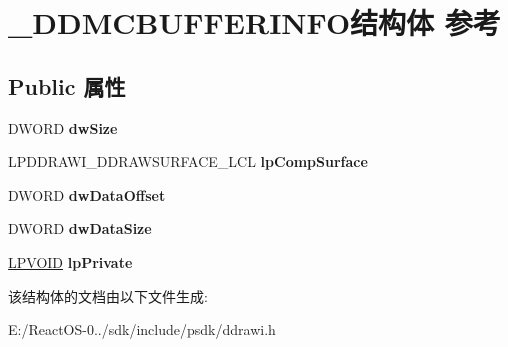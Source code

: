 \hypertarget{struct___d_d_m_c_b_u_f_f_e_r_i_n_f_o}{}\section{\+\_\+\+D\+D\+M\+C\+B\+U\+F\+F\+E\+R\+I\+N\+F\+O结构体 参考}
\label{struct___d_d_m_c_b_u_f_f_e_r_i_n_f_o}
\subsection*{Public 属性}
\begin{DoxyCompactItemize}
\item 
\mbox{\label{struct___d_d_m_c_b_u_f_f_e_r_i_n_f_o_a3890ac46e6c8ee35646096ac106669cc}} 
D\+W\+O\+RD {\bfseries dw\+Size}
\item 
\mbox{\label{struct___d_d_m_c_b_u_f_f_e_r_i_n_f_o_a10d9ac5b808b03881554ee81e85c9862}} 
L\+P\+D\+D\+R\+A\+W\+I\+\_\+\+D\+D\+R\+A\+W\+S\+U\+R\+F\+A\+C\+E\+\_\+\+L\+CL {\bfseries lp\+Comp\+Surface}
\item 
\mbox{\label{struct___d_d_m_c_b_u_f_f_e_r_i_n_f_o_a41319447a9ccf2d7fd5b8f1f2e17fc33}} 
D\+W\+O\+RD {\bfseries dw\+Data\+Offset}
\item 
\mbox{\label{struct___d_d_m_c_b_u_f_f_e_r_i_n_f_o_acc6c508a1b8b34ee2953c54c452d079d}} 
D\+W\+O\+RD {\bfseries dw\+Data\+Size}
\item 
\mbox{\label{struct___d_d_m_c_b_u_f_f_e_r_i_n_f_o_a19fd3fbf2af13c0146d913caefd5d19a}} 
\hyperlink{interfacevoid}{L\+P\+V\+O\+ID} {\bfseries lp\+Private}
\end{DoxyCompactItemize}


该结构体的文档由以下文件生成\+:\begin{DoxyCompactItemize}
\item 
E\+:/\+React\+O\+S-\/0../sdk/include/psdk/ddrawi.\+h\end{DoxyCompactItemize}
